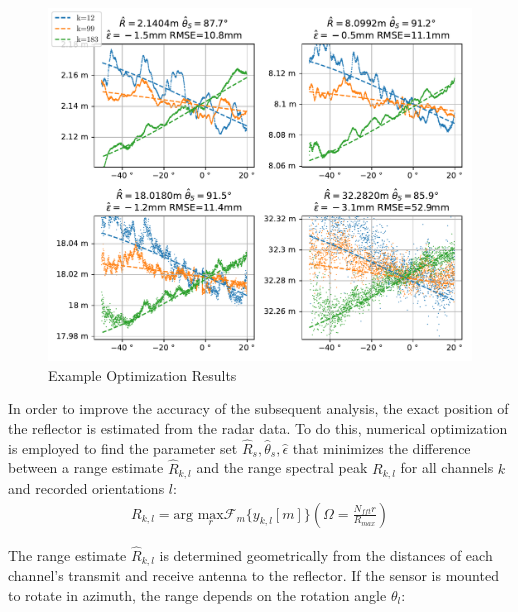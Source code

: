 \begin{figure}
    \centering
    \includegraphics[width=\textwidth]{../figures/reflpos_estimate.pdf}
    \caption{Example Optimization Results}
    \label{fig:reflpos_estimate}
\end{figure}

In order to improve the accuracy of the subsequent analysis, the exact position of the reflector is estimated from the radar data.
To do this, numerical optimization is employed to find the parameter set 
$\hat R_s, \hat \theta_s, \hat \epsilon$ that minimizes the difference between
a range estimate $\hat R_{k,l}$ and the range spectral peak $R_{k,l}$ for all channels $k$ and recorded orientations $l$:
\begin{align}
    R_{k,l} = \text{arg } \underset{r}{\text{max}}\mathcal{F}_m\{y_{k,l}[m]\}\left(\Omega = \frac{N_{fft}r}{R_{max}}\right)
\end{align}

The range estimate $\hat R_{k,l}$ is determined geometrically from the distances of each channel's
transmit and receive antenna to the reflector. If the sensor is mounted to rotate in azimuth,
the range depends on the rotation angle $\theta_l $:

